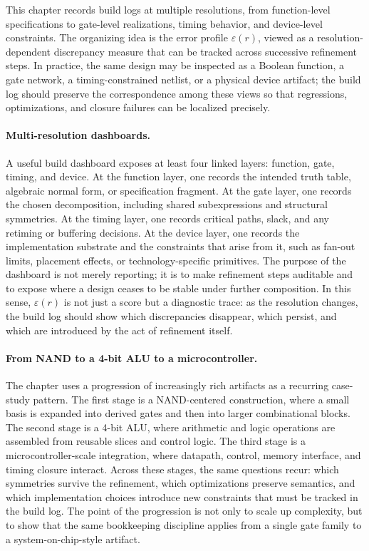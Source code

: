 This chapter records build logs at multiple resolutions, from function-level specifications to gate-level realizations, timing behavior, and device-level constraints. The organizing idea is the error profile \(\varepsilon(r)\), viewed as a resolution-dependent discrepancy measure that can be tracked across successive refinement steps. In practice, the same design may be inspected as a Boolean function, a gate network, a timing-constrained netlist, or a physical device artifact; the build log should preserve the correspondence among these views so that regressions, optimizations, and closure failures can be localized precisely.

\paragraph{Multi-resolution dashboards.}
A useful build dashboard exposes at least four linked layers: function, gate, timing, and device. At the function layer, one records the intended truth table, algebraic normal form, or specification fragment. At the gate layer, one records the chosen decomposition, including shared subexpressions and structural symmetries. At the timing layer, one records critical paths, slack, and any retiming or buffering decisions. At the device layer, one records the implementation substrate and the constraints that arise from it, such as fan-out limits, placement effects, or technology-specific primitives. The purpose of the dashboard is not merely reporting; it is to make refinement steps auditable and to expose where a design ceases to be stable under further composition. In this sense, \(\varepsilon(r)\) is not just a score but a diagnostic trace: as the resolution changes, the build log should show which discrepancies disappear, which persist, and which are introduced by the act of refinement itself.

\paragraph{From NAND to a 4-bit ALU to a microcontroller.}
The chapter uses a progression of increasingly rich artifacts as a recurring case-study pattern. The first stage is a NAND-centered construction, where a small basis is expanded into derived gates and then into larger combinational blocks. The second stage is a 4-bit ALU, where arithmetic and logic operations are assembled from reusable slices and control logic. The third stage is a microcontroller-scale integration, where datapath, control, memory interface, and timing closure interact. Across these stages, the same questions recur: which symmetries survive the refinement, which optimizations preserve semantics, and which implementation choices introduce new constraints that must be tracked in the build log. The point of the progression is not only to scale up complexity, but to show that the same bookkeeping discipline applies from a single gate family to a system-on-chip-style artifact.

